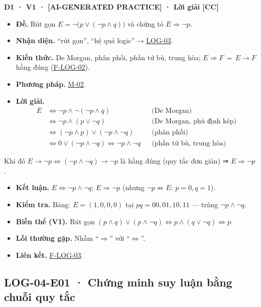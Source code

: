 \documentclass[
  10pt,
  twoside,openany]{book}
\providecommand{\tightlist}{%
  \setlength{\itemsep}{0pt}\setlength{\parskip}{0pt}}
\begin{document}
\textbf{D1 · V1 · {[}AI-GENERATED PRACTICE{]} · Lời giải {[}CC{]}}

\begin{itemize}
\tightlist
\item
  \textbf{Đề.} Rút gọn \(E=\neg\big(p\vee(\neg p\wedge q)\big)\) và
  chứng tỏ \(E\Rightarrow\neg p\).
\item
  \textbf{Nhận diện.} ``rút gọn'', ``hệ quả logic'' →
  \protect\hyperlink{LOG-03}{LOG-03}.
\item
  \textbf{Kiến thức.} De Morgan, phân phối, phần tử bù, trung hòa;
  \(E\Rightarrow F\) ⇔ \(E\to F\) hằng đúng
  (\protect\hyperlink{F-LOG-02}{F-LOG-02}).
\item
  \textbf{Phương pháp.} \protect\hyperlink{M-02}{M-02}.
\item
  \textbf{Lời giải.} \[
  \begin{aligned}
  E&\Leftrightarrow\neg p\wedge\neg(\neg p\wedge q) &&\text{(De Morgan)}\\
  &\Leftrightarrow\neg p\wedge(p\vee\neg q) &&\text{(De Morgan, phủ định kép)}\\
  &\Leftrightarrow(\neg p\wedge p)\vee(\neg p\wedge\neg q) &&\text{(phân phối)}\\
  &\Leftrightarrow0\vee(\neg p\wedge\neg q)\Leftrightarrow\neg p\wedge\neg q &&\text{(phần tử bù, trung hòa)}
  \end{aligned}
  \]
\end{itemize}

Khi đó \(E\to\neg p\Leftrightarrow(\neg p\wedge\neg q)\to\neg p\) là
hằng đúng (quy tắc đơn giản) ⇒ \(E\Rightarrow\neg p\).

\begin{itemize}
\tightlist
\item
  \textbf{Kết luận.} \(E\Leftrightarrow\neg p\wedge\neg q\);
  \(E\Rightarrow\neg p\) (nhưng \(\neg p\not\Rightarrow E\):
  \(p=0,q=1\)).
\item
  \textbf{Kiểm tra.} Bảng: \(E=(1,0,0,0)\) tại \(pq=00,01,10,11\) ---
  trùng \(\neg p\wedge\neg q\).
\item
  \textbf{Biến thể (V1).} Rút gọn
  \((p\wedge q)\vee(p\wedge\neg q)\Leftrightarrow p\wedge(q\vee\neg q)\Leftrightarrow p\).
\item
  \textbf{Lỗi thường gặp.} Nhầm ``\(\Rightarrow\)'' với
  ``\(\Leftrightarrow\)''.
\item
  \textbf{Liên kết.} \protect\hyperlink{F-LOG-03}{F-LOG-03}.
\end{itemize}

\hypertarget{LOG-04-E01}{%
\subsection{LOG-04-E01 · Chứng minh suy luận bằng chuỗi quy
tắc}\label{LOG-04-E01}}
\end{document}
